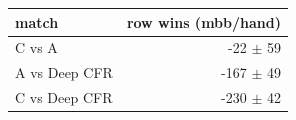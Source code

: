 \begin{tabular}{lr}
\toprule
match & row wins (mbb/hand) \\
\midrule
C vs A & -22 $\pm$ 59 \\
A vs Deep CFR & -167 $\pm$ 49 \\
C vs Deep CFR & -230 $\pm$ 42 \\
\bottomrule
\end{tabular}
